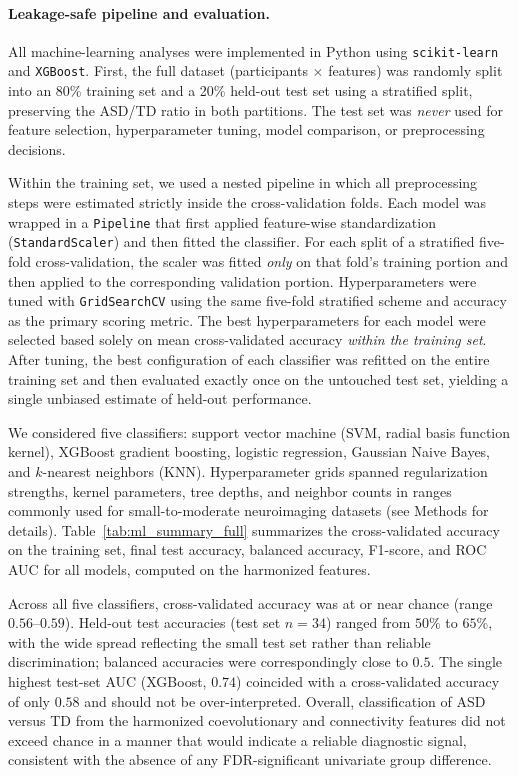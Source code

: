 \documentclass[10pt,letterpaper]{article}
\begin{document}
\paragraph*{Leakage-safe pipeline and evaluation.}
All machine-learning analyses were implemented in Python using \texttt{scikit-learn} and
\texttt{XGBoost}. First, the full dataset (participants $\times$ features) was randomly split into
an 80\% training set and a 20\% held-out test set using a stratified split, preserving the ASD/TD
ratio in both partitions. The test set was \emph{never} used for feature selection, hyperparameter
tuning, model comparison, or preprocessing decisions.

Within the training set, we used a nested pipeline in which all preprocessing steps were estimated
strictly inside the cross-validation folds. Each model was wrapped in a \texttt{Pipeline} that
first applied feature-wise standardization (\texttt{StandardScaler}) and then fitted the classifier.
For each split of a stratified five-fold cross-validation, the scaler was fitted \emph{only} on
that fold's training portion and then applied to the corresponding validation portion. Hyperparameters
were tuned with \texttt{GridSearchCV} using the same five-fold stratified scheme and accuracy as
the primary scoring metric. The best hyperparameters for each model were selected based solely on
mean cross-validated accuracy \emph{within the training set}. After tuning, the best configuration
of each classifier was refitted on the entire training set and then evaluated exactly once on the
untouched test set, yielding a single unbiased estimate of held-out performance.

We considered five classifiers: support vector machine (SVM, radial basis function kernel), XGBoost
gradient boosting, logistic regression, Gaussian Naive Bayes, and $k$-nearest neighbors (KNN).
Hyperparameter grids spanned regularization strengths, kernel parameters, tree depths, and neighbor
counts in ranges commonly used for small-to-moderate neuroimaging datasets (see Methods for details).
Table~\ref{tab:ml_summary_full} summarizes the cross-validated accuracy on the training set, final
test accuracy, balanced accuracy, F1-score, and ROC AUC for all models, computed on the harmonized
features.

Across all five classifiers, cross-validated accuracy was at or near chance (range $0.56$--$0.59$).
Held-out test accuracies (test set $n = 34$) ranged from $50\%$ to $65\%$, with the wide spread
reflecting the small test set rather than reliable discrimination; balanced accuracies were
correspondingly close to $0.5$. The single highest test-set AUC (XGBoost, $0.74$) coincided with a
cross-validated accuracy of only $0.58$ and should not be over-interpreted. Overall, classification
of ASD versus TD from the harmonized coevolutionary and connectivity features did not exceed chance
in a manner that would indicate a reliable diagnostic signal, consistent with the absence of any
FDR-significant univariate group difference.
\end{document}
